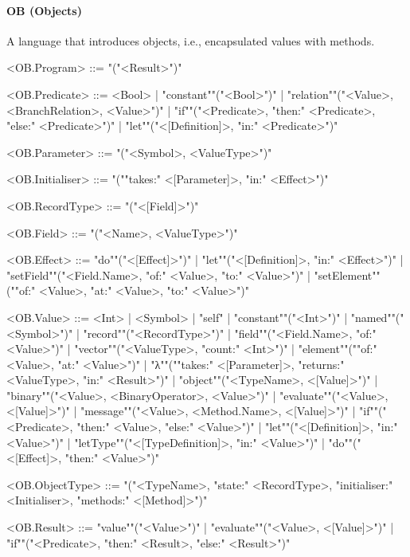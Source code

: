 \documentclass[main.tex]{subfiles}
\begin{document}
\paragraph{ OB (Objects) } A language that introduces objects, i.e., encapsulated values with methods.
\begin{grammar}
	\footnotesize
				<OB.Program> ::=
							"("<Result>")"
				\par
				<OB.Predicate> ::=
						<Bool> |
						"constant""("<Bool>")"
						| "relation""("<Value>, <BranchRelation>, <Value>")"
						| "if""("<Predicate>, "then:" <Predicate>, "else:" <Predicate>")"
						| "let""("<[Definition]>, "in:" <Predicate>")"
				\par
				<OB.Parameter> ::=
							"("<Symbol>, <ValueType>")"
				\par
				<OB.Initialiser> ::=
							"(""takes:" <[Parameter]>, "in:" <Effect>")"
				\par
				<OB.RecordType> ::=
							"("<[Field]>")"
				\par
				<OB.Field> ::=
							"("<Name>, <ValueType>")"
				\par
				<OB.Effect> ::=
						"do""("<[Effect]>")"
						| "let""("<[Definition]>, "in:" <Effect>")"
						| "setField""("<Field.Name>, "of:" <Value>, "to:" <Value>")"
						| "setElement""(""of:" <Value>, "at:" <Value>, "to:" <Value>")"
				\par
				<OB.Value> ::=
						<Int> |
								<Symbol> |
						"self"
						| "constant""("<Int>")"
						| "named""("<Symbol>")"
						| "record""("<RecordType>")"
						| "field""("<Field.Name>, "of:" <Value>")"
						| "vector""("<ValueType>, "count:" <Int>")"
						| "element""(""of:" <Value>, "at:" <Value>")"
						| "λ""(""takes:" <[Parameter]>, "returns:" <ValueType>, "in:" <Result>")"
						| "object""("<TypeName>, <[Value]>")"
						| "binary""("<Value>, <BinaryOperator>, <Value>")"
						| "evaluate""("<Value>, <[Value]>")"
						| "message""("<Value>, <Method.Name>, <[Value]>")"
						| "if""("<Predicate>, "then:" <Value>, "else:" <Value>")"
						| "let""("<[Definition]>, "in:" <Value>")"
						| "letType""("<[TypeDefinition]>, "in:" <Value>")"
						| "do""("<[Effect]>, "then:" <Value>")"
				\par
				<OB.ObjectType> ::=
							"("<TypeName>, "state:" <RecordType>, "initialiser:" <Initialiser>, "methods:" <[Method]>")"
				\par
				<OB.Result> ::=
						"value""("<Value>")"
						| "evaluate""("<Value>, <[Value]>")"
						| "if""("<Predicate>, "then:" <Result>, "else:" <Result>")"

\end{grammar}
\end{document}

